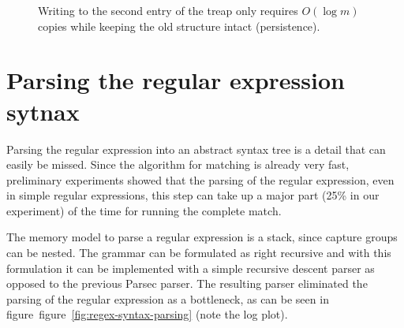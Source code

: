 \documentclass[11pt]{Thesis}
\theoremstyle{definition}
\newcommand{\Figref}[1]{figure~\ref{fig:#1}}
\newcommand{\figlabel}[1]{\label{fig:#1}}
\newcommand{\seclabel}[1]{\label{sec:#1}}
\begin{document}
\begin{figure}
\caption{\figlabel{treap}Writing to the second entry of the treap only requires
$O(\log m)$ copies while keeping the old structure intact (persistence).}
\end{figure}

\section{Parsing the regular expression sytnax}  \seclabel{regex-syntax}
Parsing the regular expression into an abstract syntax tree is a detail that
can easily be missed. Since the algorithm for matching is already very fast,
preliminary experiments showed that the parsing of the regular expression, even
in simple regular expressions, this step can take up a major part (25\% in our
experiment) of the time for running the complete match.

The memory model to parse a regular expression is a stack, since capture groups
can be nested. The grammar can be formulated as right recursive and with this
formulation it can be implemented with a simple recursive descent parser as 
opposed to the previous Parsec parser. The resulting parser eliminated the 
parsing of the regular expression as a bottleneck, as can be seen in
figure~\Figref{regex-syntax-parsing} (note the log plot).
\end{document}

